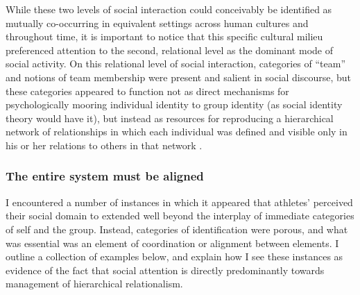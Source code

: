 \begin{CJK}{UTF8}{gbsn}
While these two levels of social interaction could conceivably be identified as mutually co-occurring in equivalent settings across human cultures and throughout time, it is important to notice that this specific cultural milieu preferenced attention to the second, relational level as the dominant mode of social activity.  On this relational level of social interaction, categories of ``team'' and notions of team membership were present and salient in social discourse, but these categories appeared to function not as direct mechanisms for psychologically mooring individual identity to group identity (as social identity theory would have it), but instead as resources for reproducing a hierarchical network of relationships in which each individual was defined and visible only in his or her relations to others in that network \cite{Yuki2003}.



\subsubsection{The entire system must be aligned}
I encountered a number of instances in which it appeared that athletes' perceived their social domain to extended well beyond the interplay of immediate categories of self and the group.  Instead, categories of identification were porous, and what was essential was an element of coordination or alignment between elements. I outline a collection of examples below, and explain how I see these instances as evidence of the fact that social attention is directly predominantly towards management of hierarchical relationalism.


\end{CJK}
